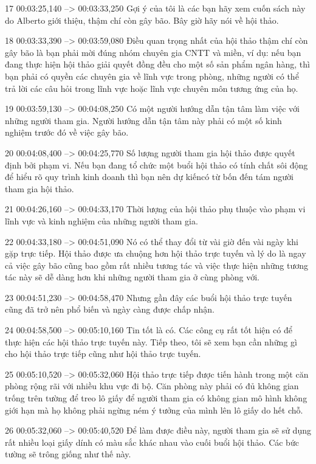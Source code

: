 17
00:03:25,140 --> 00:03:33,250
Gợi ý của tôi là các bạn hãy xem cuốn sách này do Alberto giới thiệu, thậm chí còn gây bão.  Bây giờ hãy nói về hội thảo.

18
00:03:33,390 --> 00:03:59,080
Điều quan trọng nhất của hội thảo thậm chí còn gây bão là bạn phải mời đúng nhóm chuyên gia CNTT và miền, ví dụ: nếu bạn đang thực hiện hội thảo giải quyết đồng đều cho một số sản phẩm ngân hàng, thì bạn phải có quyền  các chuyên gia về lĩnh vực trong phòng, những người có thể trả lời các câu hỏi trong lĩnh vực hoặc lĩnh vực chuyên môn tương ứng của họ.

19
00:03:59,130 --> 00:04:08,250
Có một người hướng dẫn tận tâm làm việc với những người tham gia.  Người hướng dẫn tận tâm này phải có một số kinh nghiệm trước đó về việc gây bão.

20
00:04:08,400 --> 00:04:25,770
Số lượng người tham gia hội thảo được quyết định bởi phạm vi.  Nếu bạn đang tổ chức một buổi hội thảo có tính chất sôi động để hiểu rõ quy trình kinh doanh thì bạn nên dự kiến ​​có từ bốn đến tám người tham gia hội thảo.

21
00:04:26,160 --> 00:04:33,170
Thời lượng của hội thảo phụ thuộc vào phạm vi lĩnh vực và kinh nghiệm của những người tham gia.

22
00:04:33,180 --> 00:04:51,090
Nó có thể thay đổi từ vài giờ đến vài ngày khi gặp trực tiếp.  Hội thảo được ưa chuộng hơn hội thảo trực tuyến và lý do là ngay cả việc gây bão cũng bao gồm rất nhiều tương tác và việc thực hiện những tương tác này sẽ dễ dàng hơn khi những người tham gia ở cùng phòng với.

23
00:04:51,230 --> 00:04:58,470
Nhưng gần đây các buổi hội thảo trực tuyến cũng đã trở nên phổ biến và ngày càng được chấp nhận.

24
00:04:58,500 --> 00:05:10,160
Tin tốt là có.  Các công cụ rất tốt hiện có để thực hiện các hội thảo trực tuyến này.  Tiếp theo, tôi sẽ xem bạn cần những gì cho hội thảo trực tiếp cũng như hội thảo trực tuyến.

25
00:05:10,520 --> 00:05:32,060
Hội thảo trực tiếp được tiến hành trong một căn phòng rộng rãi với nhiều khu vực đi bộ.  Căn phòng này phải có đủ không gian trống trên tường để treo lô giấy để người tham gia có không gian mô hình không giới hạn mà họ không phải ngừng ném ý tưởng của mình lên lô giấy do hết chỗ.

26
00:05:32,060 --> 00:05:40,520
Để làm được điều này, người tham gia sẽ sử dụng rất nhiều loại giấy dính có màu sắc khác nhau vào cuối buổi hội thảo.  Các bức tường sẽ trông giống như thế này.

